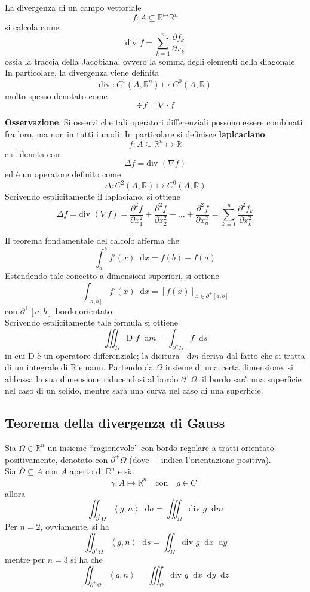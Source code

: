 \documentclass[a4paper]{extarticle}
\newcommand{\quotes}[1]{``#1''}
\newcommand*\dif{\mathop{}\!\mathrm{d}}
\begin{document}
\vspace{1em}
\noindent
La divergenza di un campo vettoriale
\[f : A \subseteq \mathbb{R}^ \longmapsto \mathbb{R}^n\]
si calcola come
\[\text{div } f = \sum_{k=1}^n \dfrac{\partial f_k}{\partial x_k}\]
ossia la traccia della Jacobiana, ovvero la somma degli elementi della diagonale. In particolare, la divergenza viene definita
\[\text{div } : C^1(A,\mathbb{R}^n) \longmapsto C^0(A,\mathbb{R})\]
molto spesso denotato come
\[\div f = \nabla \cdot f\]

\vspace{2em}
\noindent
\textbf{Osservazione}: Si osservi che tali operatori differenziali possono essere combinati fra loro, ma non in tutti i modi. In particolare si definisce \textbf{laplcaciano}
\[f : A \subseteq \mathbb{R}^n \longmapsto \mathbb{R}\]
e si denota con
\[\Delta f = \text{div } \left(\nabla f\right)\]
ed è un operatore definito come
\[\Delta : C^2(A,\mathbb{R}) \longmapsto C^0(A,\mathbb{R})\]
Scrivendo esplicitamente il laplaciano, si ottiene
\[\Delta f = \text{div } \left(\nabla f\right) = \dfrac{\partial^2 f}{\partial x_1^2} + \dfrac{\partial^2 f}{\partial x_2^2} + \dots + \dfrac{\partial^2 f}{\partial x_n^2} = \sum_{k=1}^n \dfrac{\partial^2 f_k}{\partial x_k^2}\]


\vspace{1em}
\noindent
Il teorema fondamentale del calcolo afferma che
\[\int_a^b f'(x) \dif x = f(b) - f(a)\]
Estendendo tale concetto a dimensioni superiori, si ottiene
\[\int_{[a,b]} f'(x) \dif x = \left[f(x)\right]_{x \in \partial^+[a,b]}\]
con $\partial^+[a,b]$ bordo orientato.\\
Scrivendo esplicitamente tale formula si ottiene
\[\iiint_{\Omega} \text{D } f \dif m = \int_{\partial^+ \Omega} f \dif s\]
in cui D è un operatore differenziale; la dicitura $\dif m$ deriva dal fatto che si tratta di un integrale di Riemann. Partendo da $\Omega$ insieme di una certa dimensione, si abbassa la sua dimensione riducendosi al bordo $\partial^+ \Omega$: il bordo sarà una superficie nel caso di un solido, mentre sarà una curva nel caso di una superficie.

\vspace{1em}
\noindent
\subsection{Teorema della divergenza di Gauss}
Sia $\Omega \in \mathbb{R}^n$ un insieme \quotes{ragionevole} con bordo regolare a tratti orientato positivamente, denotato con $\partial^+ \Omega$ (dove $+$ indica l'orientazione positiva).\\
Sia $\overline{\Omega} \subseteq A$ con $A$ aperto di $\mathbb{R}^n$ e sia
\[\gamma : A \longmapsto \mathbb{R}^n \hspace{1em} \text{con} \hspace{1em} g \in C^1\]
allora
\[\iint_{\partial^* \Omega} \left<g,n\right> \dif \sigma = \iiint_\Omega \text{div } g \dif m\]
Per $n=2$, ovviamente, si ha
\[\iint_{\partial^+ \Omega} \left<g,n\right> \dif s = \iint_{\Omega} \text{div } g \dif x \dif y\]
mentre per $n=3$ si ha che
\[\iint_{\partial^+ \Omega} \left<g,n\right> = \iiint_{\Omega} \text{div } g \dif x \dif y \dif z\]
\end{document}
